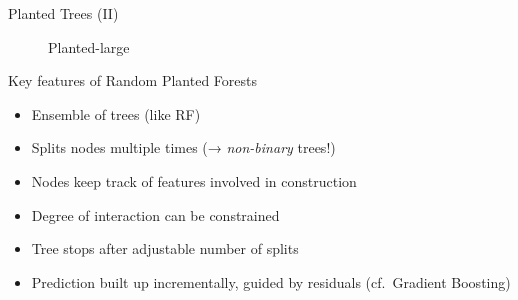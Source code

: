 \documentclass[aspectratio=169,12pt]{beamer}
\providecommand{\tightlist}{%
  \setlength{\itemsep}{2pt}\setlength{\parskip}{0pt}}
\begin{document}
\begin{frame}{Planted Trees (II)}
\label{planted-trees-ii}
\begin{figure}


\caption{\label{fig-planted}Planted-large}

\end{figure}%
\end{frame}

\begin{frame}{Key features of Random Planted Forests}
\label{key-features-of-random-planted-forests}
\begin{itemize}[<+->]
\tightlist
\item
  Ensemble of trees (like RF)
\item
  Splits nodes multiple times (→ \emph{non-binary} trees!)
\item
  Nodes keep track of features involved in construction
\item
  Degree of interaction can be constrained
\item
  Tree stops after adjustable number of splits
\item
  Prediction built up incrementally, guided by residuals (cf.~Gradient
  Boosting)
\end{itemize}
\end{frame}
\end{document}
